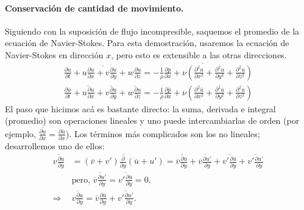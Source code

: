 \paragraph*{Conservación de cantidad de movimiento.}
Siguiendo con la suposición de flujo incompresible, saquemos el promedio de la ecuación de Navier-Stokes.
Para esta demostración, usaremos la ecuación de Navier-Stokes en dirección $x$, pero esto es extensible a las otras direcciones.
%
\begin{align}\label{eq:RANS_prev}
\overline{\frac{\partial u}{\partial t} + u\frac{\partial u}{\partial x} + v\frac{\partial u}{\partial y} + w\frac{\partial u}{\partial z}} = \overline{-\frac{1}{\rho}\frac{\partial p}{\partial x} + \nu\left(\frac{\partial^2u}{\partial x^2}+ \frac{\partial^2u}{\partial y^2}+\frac{\partial^2u}{\partial z^2}\right)}\nonumber\\
\frac{\partial \overline{u}}{\partial t} + \overline{u\frac{\partial u}{\partial x}} + \overline{v\frac{\partial u}{\partial y}} + \overline{w\frac{\partial u}{\partial z}} = -\frac{1}{\rho}\frac{\partial \overline{p}}{\partial x} + \nu\left(\frac{\partial^2\overline{u}}{\partial x^2}+ \frac{\partial^2\overline{u}}{\partial y^2}+\frac{\partial^2\overline{u}}{\partial z^2}\right)
\end{align}
%
El paso que hicimos acá es bastante directo: la suma, derivada e integral (promedio) son operaciones lineales y uno puede intercambiarlas de orden (por ejemplo, $\overline{\frac{\partial u}{\partial x}} = \frac{\partial\overline{u}}{\partial x}$).
Los términos más complicados son los no lineales; desarrollemos uno de ellos:
%
\begin{align}
\overline{v\frac{\partial u}{\partial y}} &= \overline{(\overline{v}+v')\frac{\partial}{\partial y}(\overline{u}+u')} = \overline{\overline{v}\frac{\partial\overline{u}}{\partial y}} + \overline{\overline{v}\frac{\partial u'}{\partial y}} + \overline{v'\frac{\partial\overline{u}}{\partial y}} + \overline{v'\frac{\partial u'}{\partial y}} \nonumber\\
&\text{pero, }\overline{\overline{v}\frac{\partial u'}{\partial y}} = \overline{v'\frac{\partial\overline{u}}{\partial y}}=0, \nonumber\\
\Rightarrow&\overline{v\frac{\partial u}{\partial y}}= \overline{v}\frac{\partial\overline{u}}{\partial y} + \overline{v'\frac{\partial u'}{\partial y}}.
\end{align}

